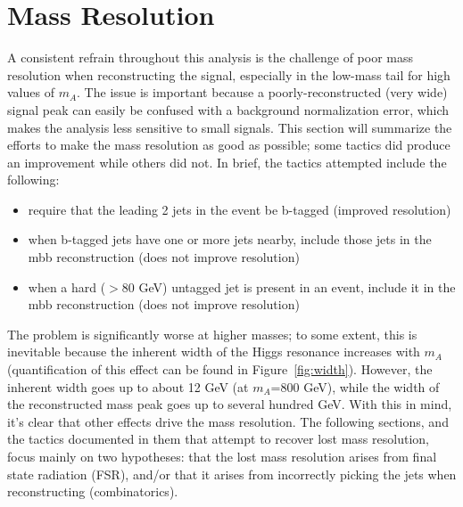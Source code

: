 \section{Mass Resolution}
\label{sec:mass_res}


A consistent refrain throughout this analysis is the challenge of poor mass resolution when reconstructing
the signal, especially in the low-mass tail for high values of $m_A$. The 
issue is important because a poorly-reconstructed (very wide)
signal peak can easily be confused with a background normalization error, which makes the analysis less
sensitive to small signals. This section will summarize the efforts to make the mass resolution as good
as possible; some tactics did produce an improvement while others did not.  In brief, the tactics
attempted include the following:

\begin{itemize}
    \item require that the leading 2 jets in the event be b-tagged (improved resolution)
    \item when b-tagged jets have one or more jets nearby, include those jets in the mbb reconstruction (does
not improve resolution)
    \item when a hard ($>$80 GeV) untagged jet is present in an event, include it in the mbb reconstruction
(does not improve resolution)
\end{itemize}


The problem is significantly worse at higher masses;
to some extent, this is inevitable because the inherent width of the Higgs resonance increases with $m_A$
(quantification of this effect can be found in Figure~\ref{fig:width}). However, the inherent width goes up to about 12
GeV (at $m_A$=800 GeV), while the width of the reconstructed mass peak goes up to several hundred GeV.
With this in mind, it’s clear that other effects drive the mass resolution.  The following sections, 
and the tactics documented in them that attempt to recover lost mass resolution, focus mainly 
on two hypotheses: that the lost mass resolution arises from final state radiation (FSR), and/or
that it arises from incorrectly picking the jets when reconstructing (combinatorics). 




